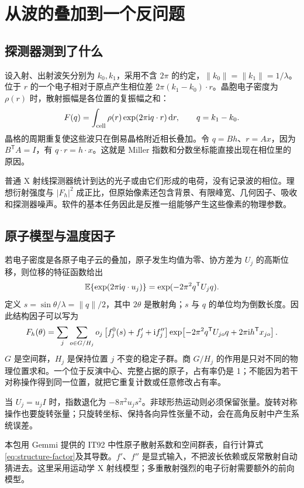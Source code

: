 \chapter{从波的叠加到一个反问题}
\section{探测器测到了什么}
设入射、出射波矢分别为 $k_0,k_1$，采用不含 $2\pi$ 的约定，$\|k_0\|=\|k_1\|=1/\lambda$。位于 $r$ 的一个电子相对于原点产生相位差 $2\pi(k_1-k_0)\cdot r$。晶胞电子密度为 $\rho(r)$ 时，散射振幅是各位置的复振幅之和：
\begin{equation}
 F(q)=\int_{\text{cell}}\rho(r)\exp(2\pi\mathrm{i} q\cdot r)\,\mathrm{d} r,
 \qquad q=k_1-k_0 .
\end{equation}
晶格的周期重复使这些波只在倒易晶格附近相长叠加。令 $q=Bh$、$r=Ax$，因为 $B^{\mathsf T}A=I$，有 $q\cdot r=h\cdot x$。这就是 Miller 指数和分数坐标能直接出现在相位里的原因。

普通 X 射线探测器统计到达的光子或由它们形成的电荷，没有记录波的相位。理想衍射强度与 $|F_h|^2$ 成正比，但原始像素还包含背景、有限峰宽、几何因子、吸收和探测器噪声。软件的基本任务因此是反推一组能够产生这些像素的物理参数。

\section{原子模型与温度因子}
若电子密度是各原子电子云的叠加，原子发生均值为零、协方差为 $U_j$ 的高斯位移，则位移的特征函数给出
\begin{equation}
 \mathbb{E}\{\exp(2\pi\mathrm{i} q\cdot u_j)\}=\exp(-2\pi^2q^{\mathsf T}U_jq).
\end{equation}
定义 $s=\sin\theta/\lambda=\|q\|/2$，其中 $2\theta$ 是散射角；$s$ 与 $q$ 的单位均为倒数长度。因此结构因子可以写为
\begin{equation}\label{eq:structure-factor}
 F_h(\theta)=\sum_j\sum_{o\in G/H_j}o_j
 \left[f^0_j(s)+f'_j+\mathrm{i} f''_j\right]
 \exp\!\left[-2\pi^2q^{\mathsf T}U_{jo}q+2\pi\mathrm{i} h^{\mathsf T}x_{jo}\right].
\end{equation}
$G$ 是空间群，$H_j$ 是保持位置 $j$ 不变的稳定子群。商 $G/H_j$ 的作用是只对不同的物理位置求和。一个位于反演中心、完整占据的原子，占有率仍是 1；不能因为若干对称操作得到同一位置，就把它重复计数或任意修改占有率。

当 $U_j=u_jI$ 时，指数退化为 $-8\pi^2u_js^2$。非球形热运动则必须保留张量。旋转对称操作也要旋转张量；只旋转坐标、保持各向异性张量不动，会在高角反射中产生系统误差。

本包用 Gemmi 提供的 IT92 中性原子散射系数和空间群表，自行计算式\eqref{eq:structure-factor}及其导数。$f'$、$f''$ 是显式输入，不把波长依赖或反常散射自动猜进去。这里采用运动学 X 射线模型；多重散射强烈的电子衍射需要额外的前向模型。

